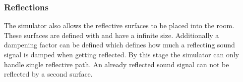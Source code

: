 \subsubsection{Reflections}
The simulator also allows the reflective surfaces to be placed into the room.
These surfaces are defined with  and have a infinite size.
Additionally a dampening factor can be defined which defines how much 
a reflecting sound signal is damped when getting reflected.
By this stage the simulator can only handle single reflective path. 
An already reflected sound signal can not be reflected by a second surface.



